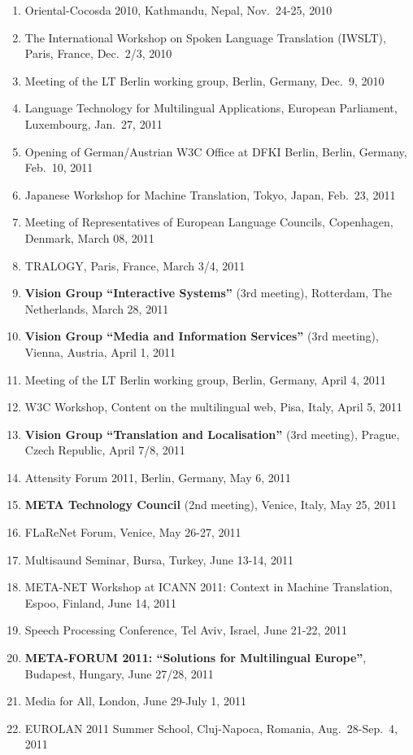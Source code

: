 \documentclass[10pt, plain]{../../metanetpaper}
\begin{document}
\begin{footnotesize}
\begin{enumerate}
\item Oriental-Cocosda 2010, Kathmandu, Nepal, Nov.~24-25, 2010
\item The International Workshop on Spoken Language Translation (IWSLT), Paris, France, Dec.~2/3, 2010
\item Meeting of the LT Berlin working group, Berlin, Germany, Dec.~9, 2010
\item Language Technology for Multilingual Applications, European Parliament, Luxembourg, Jan.~27, 2011
\item Opening of German/Austrian W3C Office at DFKI Berlin, Berlin, Germany, Feb.~10, 2011
\item Japanese Workshop for Machine Translation, Tokyo, Japan, Feb.~23, 2011
\item Meeting of Representatives of European Language Councils, Copenhagen, Denmark, March 08, 2011
\item TRALOGY, Paris, France, March 3/4, 2011
\item \textbf{Vision Group ``Interactive Systems''} (3rd meeting), Rotterdam, The Netherlands, March 28, 2011
\item \textbf{Vision Group ``Media and Information Services''} (3rd meeting), Vienna, Austria, April 1, 2011
\item Meeting of the LT Berlin working group, Berlin, Germany, April 4, 2011
\item W3C Workshop, Content on the multilingual web, Pisa, Italy, April 5, 2011
\item \textbf{Vision Group ``Translation and Localisation''} (3rd meeting), Prague, Czech Republic, April 7/8, 2011
\item Attensity Forum 2011, Berlin, Germany, May 6, 2011
\item \textbf{META Technology Council} (2nd meeting), Venice, Italy, May 25, 2011
\item FLaReNet Forum, Venice, May 26-27, 2011
\item Multisaund Seminar, Bursa, Turkey, June 13-14, 2011
\item META-NET Workshop at ICANN 2011: Context in Machine Translation,
Espoo, Finland, June 14, 2011
\item Speech Processing Conference, Tel Aviv, Israel, June 21-22, 2011
\item \textbf{META-FORUM 2011: ``Solutions for Multilingual Europe''}, Budapest, Hungary, June 27/28, 2011
\item Media for All, London, June 29-July 1, 2011
\item EUROLAN 2011 Summer School, Cluj-Napoca, Romania, Aug.~28-Sep.~4, 2011

\end{enumerate}
\end{footnotesize}
\end{document}
